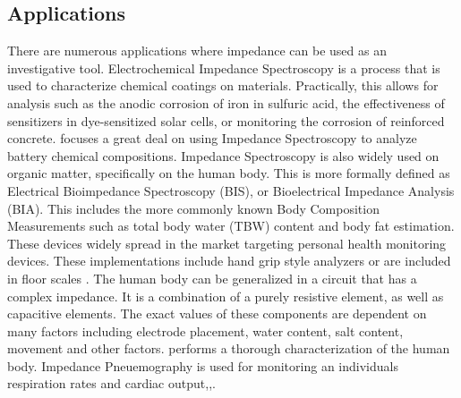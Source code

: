 \documentclass[]{IEEEtran}
\begin{document}
\subsection{Applications}
There are numerous applications where impedance can be used as an investigative tool. Electrochemical Impedance Spectroscopy is a process that is used to characterize chemical coatings on materials\cite{macdonald_reflections_2006}. Practically, this allows for analysis such as the anodic corrosion of iron in sulfuric acid, the effectiveness of sensitizers in dye-sensitized solar cells\cite{wang_electrochemical_2005}, or monitoring the corrosion of reinforced concrete\cite{ribeiro_use_2015}. \cite{barsoukov_impedance_2005} focuses a great deal on using Impedance Spectroscopy to analyze battery chemical compositions. Impedance Spectroscopy is also widely used on organic matter, specifically on the human body. This is more formally defined as Electrical Bioimpedance Spectroscopy (BIS), or Bioelectrical Impedance Analysis (BIA). This includes the more commonly known Body Composition Measurements such as total body water (TBW) content and body fat estimation. These devices widely spread in the market targeting personal health monitoring devices. These implementations include hand grip style analyzers\cite{noauthor_amazon.com:_nodate} or are included in floor scales\cite{noauthor_amazon.com:_nodate-1} . The human body can be generalized in a circuit that has a complex impedance. It is a combination of a purely resistive element, as well as capacitive elements. The exact values of these components are dependent on many factors including electrode placement, water content, salt content, movement and other factors.\cite{lukaski_assessment_1985} performs a thorough characterization of the human body. Impedance Pneuemography is used for monitoring an individuals respiration rates and cardiac output\cite{grenvik_impedance_1972},\cite{larsen_impedance_1984},\cite{ernst_impedance_1999}.
\newline
\end{document}
